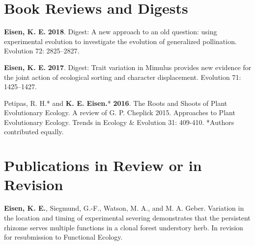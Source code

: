 \documentclass[letterpaper,11pt]{article}
\begin{document}
\section{Book Reviews and Digests}
\begin{etaremune}
\item \textbf{Eisen, K. E.} \textbf{2018}. Digest: A new approach to an old question: using experimental evolution to investigate the evolution of generalized pollination. Evolution 72: 2825–2827.\\
\item \textbf{Eisen, K. E.} \textbf{2017}. Digest: Trait variation in Mimulus provides new evidence for the joint action of ecological sorting and character displacement. Evolution 71: 1425–1427.\\
\item Petipas, R. H.* and \textbf{K. E. Eisen.}* \textbf{2016}. The Roots and Shoots of Plant Evolutionary Ecology. A review of G. P. Cheplick 2015. Approaches to Plant Evolutionary Ecology. Trends in Ecology \& Evolution 31: 409-410. *Authors contributed equally.\\
\end{etaremune}

\section{Publications in Review or in Revision}
\begin{etaremune}
\item \textbf{Eisen, K. E.}, Siegmund, G.-F., Watson, M. A., and M. A. Geber. Variation in the location and timing of experimental severing demonstrates that the persistent rhizome serves multiple functions in a clonal forest understory herb. In revision for resubmission to Functional Ecology.\\

\end{etaremune}
\end{document}
